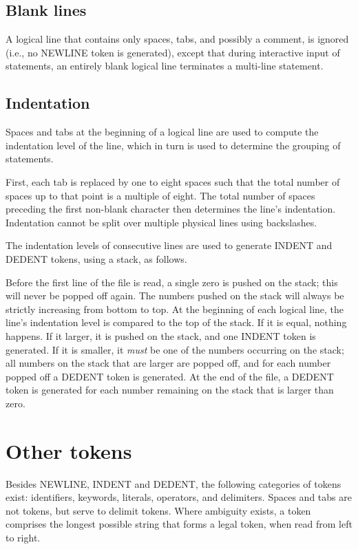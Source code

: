 \subsection{Blank lines}

A logical line that contains only spaces, tabs, and possibly a
comment, is ignored (i.e., no NEWLINE token is generated), except that
during interactive input of statements, an entirely blank logical line
terminates a multi-line statement.

\subsection{Indentation}

Spaces and tabs at the beginning of a logical line are used to compute
the indentation level of the line, which in turn is used to determine
the grouping of statements.

First, each tab is replaced by one to eight spaces such that the total
number of spaces up to that point is a multiple of eight.  The total
number of spaces preceding the first non-blank character then
determines the line's indentation.  Indentation cannot be split over
multiple physical lines using backslashes.

The indentation levels of consecutive lines are used to generate
INDENT and DEDENT tokens, using a stack, as follows.

Before the first line of the file is read, a single zero is pushed on
the stack; this will never be popped off again.  The numbers pushed on
the stack will always be strictly increasing from bottom to top.  At
the beginning of each logical line, the line's indentation level is
compared to the top of the stack.  If it is equal, nothing happens.
If it larger, it is pushed on the stack, and one INDENT token is
generated.  If it is smaller, it {\em must} be one of the numbers
occurring on the stack; all numbers on the stack that are larger are
popped off, and for each number popped off a DEDENT token is
generated.  At the end of the file, a DEDENT token is generated for
each number remaining on the stack that is larger than zero.

\section{Other tokens}

Besides NEWLINE, INDENT and DEDENT, the following categories of tokens
exist: identifiers, keywords, literals, operators, and delimiters.
Spaces and tabs are not tokens, but serve to delimit tokens.  Where
ambiguity exists, a token comprises the longest possible string that
forms a legal token, when read from left to right.

